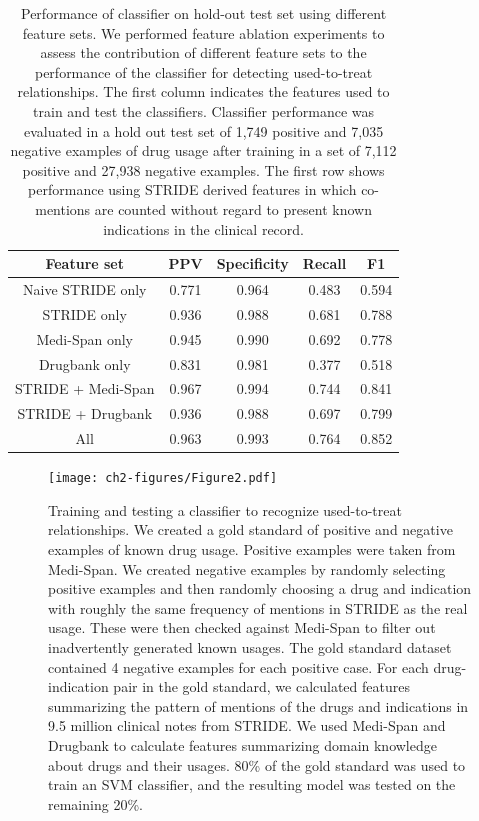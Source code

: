 \begin{table}
\begin{center}
\begin{tabular}{|c|c|c|c|c||}
  \hline Feature set & PPV & Specificity & Recall & F1 \\ \hline\hline
  Naive STRIDE only & 0.771 & 0.964 & 0.483 & 0.594 \\ STRIDE only &
  0.936 & 0.988 & 0.681 & 0.788 \\ Medi-Span only & 0.945 & 0.990 &
  0.692 & 0.778 \\ Drugbank only & 0.831 & 0.981 & 0.377 & 0.518
  \\ STRIDE + Medi-Span & 0.967 & 0.994 & 0.744 & 0.841 \\ STRIDE +
  Drugbank & 0.936 & 0.988 & 0.697 & 0.799 \\ All & 0.963 & 0.993 &
  0.764 & 0.852 \\ \hline
\end{tabular}
\end{center}
\caption[Performance of used-to-treat classifier]{Performance of
  classifier on hold-out test set using different feature sets.  We
  performed feature ablation experiments to assess the contribution of
  different feature sets to the performance of the classifier for
  detecting used-to-treat relationships.  The first column indicates
  the features used to train and test the classifiers.  Classifier
  performance was evaluated in a hold out test set of 1,749 positive
  and 7,035 negative examples of drug usage after training in a set of
  7,112 positive and 27,938 negative examples.  The first row shows
  performance using STRIDE derived features in which co-mentions are
  counted without regard to present known indications in the clinical
  record.}
\end{table}


\begin{figure}
  \begin{center}
    \texttt{[image: ch2-figures/Figure2.pdf]}
  \end{center}
  \caption[Training a classifier to recognize used-to-treat
    relationships]{Training and testing a classifier to recognize
    used-to-treat relationships.  We created a gold standard of
    positive and negative examples of known drug usage.  Positive
    examples were taken from Medi-Span.  We created negative examples
    by randomly selecting positive examples and then randomly choosing
    a drug and indication with roughly the same frequency of mentions
    in STRIDE as the real usage.  These were then checked against
    Medi-Span to filter out inadvertently generated known usages.  The
    gold standard dataset contained 4 negative examples for each
    positive case.  For each drug-indication pair in the gold
    standard, we calculated features summarizing the pattern of
    mentions of the drugs and indications in 9.5 million clinical
    notes from STRIDE. We used Medi-Span and Drugbank to calculate
    features summarizing domain knowledge about drugs and their
    usages.  80\% of the gold standard was used to train an SVM
    classifier, and the resulting model was tested on the remaining
    20\%.  }
  \label{fig:short}
\end{figure}


